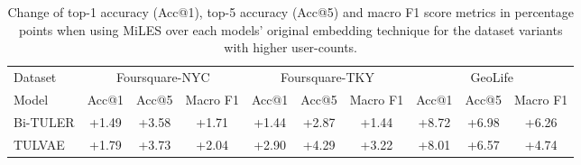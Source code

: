 \documentclass{article} %
\theoremstyle{definition}
\begin{document}
\begin{table}[ht]
    \caption{Change of top-1 accuracy (Acc@1), top-5 accuracy (Acc@5) and macro F1 score metrics in percentage points when using MiLES over each models' original embedding technique for the dataset variants with higher user-counts.}
    \label{tab:miles_improvements}
    \begin{tabular}{lccccccccc}
        \toprule
        Dataset  & \multicolumn{3}{c}{Foursquare-NYC}                    & \multicolumn{3}{c}{Foursquare-TKY}                    & \multicolumn{3}{c}{GeoLife}                                                                                                                                                                                                                                                                                                                                                                           \\
        \cmidrule(lr){2-4} \cmidrule(lr){5-7} \cmidrule(lr){8-10}
        Model    & Acc@1                                                 & Acc@5                                                 & Macro F1                                              & Acc@1                                                 & Acc@5                                                 & Macro F1                                              & Acc@1                                                 & Acc@5                                                 & Macro F1                                              \\
        \midrule
        Bi-TULER & {\cellcolor[HTML]{E8F59F}} \color[HTML]{000000} +1.49 & {\cellcolor[HTML]{BFE47A}} \color[HTML]{000000} +3.58 & {\cellcolor[HTML]{E3F399}} \color[HTML]{000000} +1.71 & {\cellcolor[HTML]{E8F59F}} \color[HTML]{000000} +1.44 & {\cellcolor[HTML]{CFEB85}} \color[HTML]{000000} +2.87 & {\cellcolor[HTML]{E8F59F}} \color[HTML]{000000} +1.44 & {\cellcolor[HTML]{36A657}} \color[HTML]{000000} +8.72 & {\cellcolor[HTML]{6BBF64}} \color[HTML]{000000} +6.98 & {\cellcolor[HTML]{7FC866}} \color[HTML]{000000} +6.26 \\
        TULVAE   & {\cellcolor[HTML]{E2F397}} \color[HTML]{000000} +1.79 & {\cellcolor[HTML]{BDE379}} \color[HTML]{000000} +3.73 & {\cellcolor[HTML]{DFF293}} \color[HTML]{000000} +2.04 & {\cellcolor[HTML]{CFEB85}} \color[HTML]{000000} +2.90 & {\cellcolor[HTML]{B1DE71}} \color[HTML]{000000} +4.29 & {\cellcolor[HTML]{C7E77F}} \color[HTML]{000000} +3.22 & {\cellcolor[HTML]{4BB05C}} \color[HTML]{000000} +8.01 & {\cellcolor[HTML]{75C465}} \color[HTML]{000000} +6.57 & {\cellcolor[HTML]{A7D96B}} \color[HTML]{000000} +4.74 \\

\end{tabular}
\end{table}
\end{document}
